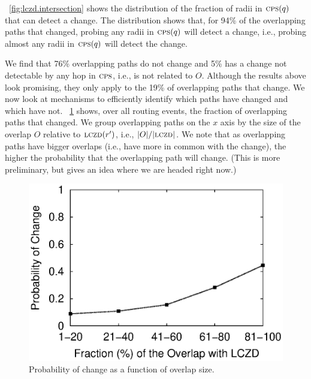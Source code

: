 

\figstr~\ref{fig:lczd.intersection} shows the distribution
of the fraction of radii in $\mathrm{\textsc{cps}}(q)$ that can detect a change.  The
distribution shows that, for 94\% of the overlapping paths that
changed, probing any radii in $\mathrm{\textsc{cps}}(q)$ will detect a change, i.e.,
probing almost any radii in $\mathrm{\textsc{cps}}(q)$ will detect the change.

  We find that 76\%
overlapping paths do not change and 5\% has a change not detectable
by any hop in $\mathrm{\textsc{cps}}$, i.e., is not related to $O$.  Although the 
results above look
promising, they only apply to the 19\% of overlapping paths that
change.  We now look at mechanisms to efficiently identify which
paths have changed and which have not.
\figstr~\ref{fig:overlap.change.prob} shows, over all routing
events, the fraction of overlapping paths that changed.  We group
overlapping paths on the $x$ axis by the size of the overlap $O$
relative to $\mathrm{\textsc{lczd}}(r')$, i.e., $|O|/|\mathrm{\textsc{lczd}}|$.  We note that as
overlapping paths have bigger overlaps (i.e., have more in common
with the change), the higher the probability that the overlapping
path will change.  (This is more preliminary, but gives an idea
where we are headed right now.)


\begin{figure}
\begin{center}
\includegraphics[width=1.05\columnwidth]{figs/patching/probchange/probchange.eps}
\caption{Probability of change as a function of overlap size.}
\label{fig:overlap.change.prob}
\end{center}
\end{figure}



